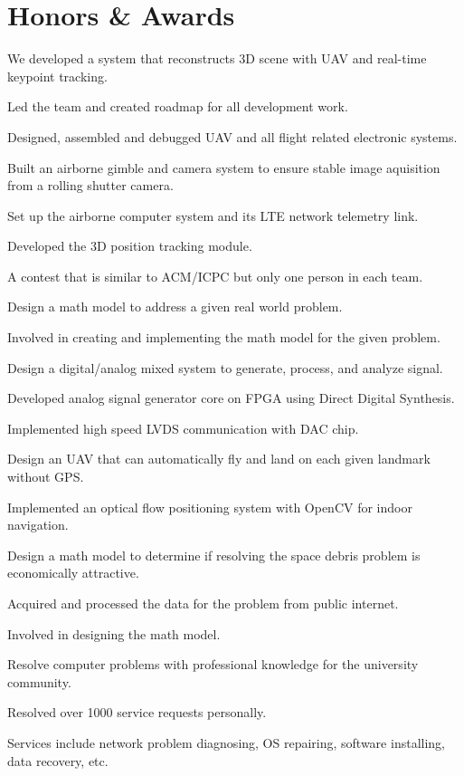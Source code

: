 \documentclass[letterpaper,11pt]{article}
\newcommand{\resumeSubItem}[1]{\item\relax #1}
\newcommand{\resumeSubHeadingListStart}{\begin{itemize}[leftmargin=0pt,label={}]}
\newcommand{\resumeSubHeadingListEnd}{\end{itemize}}
\begin{document}
\section{Honors \& Awards}{
    \resumeSubHeadingListStart
        {We developed a system that reconstructs 3D scene with UAV and real-time keypoint tracking.}{
            \resumeSubItem{Led the team and created roadmap for all development work.}
            \resumeSubItem{Designed, assembled and debugged UAV and all flight related electronic systems.}
            \resumeSubItem{Built an airborne gimble and camera system to ensure stable image aquisition from a rolling shutter camera.}
            \resumeSubItem{Set up the airborne computer system and its LTE network telemetry link.}
            \resumeSubItem{Developed the 3D position tracking module.}
        }

        {A contest that is similar to ACM/ICPC but only one person in each team.}{}

        {Design a math model to address a given real world problem.}{
            \resumeSubItem{Involved in creating and implementing the math model for the given problem.}
        }

        {Design a digital/analog mixed system to generate, process, and analyze signal.}{
            \resumeSubItem{Developed analog signal generator core on FPGA using Direct Digital Synthesis.}
            \resumeSubItem{Implemented high speed LVDS communication with DAC chip.}
        }

            {Design an UAV that can automatically fly and land on each given landmark without GPS.}{
                \resumeSubItem{Implemented an optical flow positioning system with OpenCV for indoor navigation.}
            }

            {Design a math model to determine if resolving the space debris problem is economically attractive.}{
                \resumeSubItem{Acquired and processed the data for the problem from public internet.}
                \resumeSubItem{Involved in designing the math model.}
            }

        {Resolve computer problems with professional knowledge for the university community.}{
            \resumeSubItem{Resolved over 1000 service requests personally.}
            \resumeSubItem{Services include network problem diagnosing, OS repairing, software installing, data recovery, etc.}
        }
    \resumeSubHeadingListEnd
}
\end{document}
